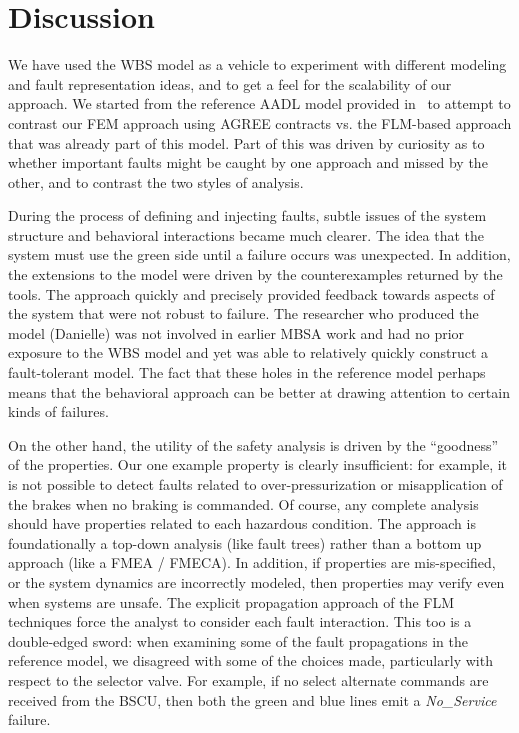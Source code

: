 \section{Discussion}
We have used the WBS model as a vehicle to experiment with different modeling and fault representation ideas, and to get a feel for the scalability of our approach.  
%
We started from the reference AADL model provided in~\cite{SEI:AADL} to attempt to contrast our FEM approach using AGREE contracts vs. the FLM-based approach that was already part of this model.  Part of this was driven by curiosity as to whether important faults might be caught by one approach and missed by the other, and to contrast the two styles of analysis.

During the process of defining and injecting faults, subtle issues of the system structure and behavioral interactions became much clearer.  The idea that the system must use the green side until a failure occurs was unexpected.  In addition, the extensions to the model were driven by the counterexamples returned by the tools.   The approach quickly and precisely provided feedback towards aspects of the system that were not robust to failure.  The researcher who produced the model (Danielle) was not involved in earlier MBSA work and had no prior exposure to the WBS model and yet was able to relatively quickly construct a fault-tolerant model.  The fact that these holes in the reference model perhaps means that the behavioral approach can be better at drawing attention to certain kinds of failures.

On the other hand, the utility of the safety analysis is driven by the ``goodness'' of the properties.  Our one example property is clearly insufficient: for example, it is not possible to detect faults related to over-pressurization or misapplication of the brakes when no braking is commanded.  Of course, any complete analysis should have properties related to each hazardous condition.  The approach is foundationally a top-down analysis (like fault trees) rather than a bottom up approach (like a FMEA / FMECA).  In addition, if properties are mis-specified, or the system dynamics are incorrectly modeled, then properties may verify even when systems are unsafe.  The explicit propagation approach of the FLM techniques force the analyst to consider each fault interaction.  This too is a double-edged sword: when examining some of the fault propagations in the reference model, we disagreed with some of the choices made, particularly with respect to the selector valve.  For example, if no select alternate commands are received from the BSCU, then both the green and blue lines emit a {\em No\_Service} failure.

